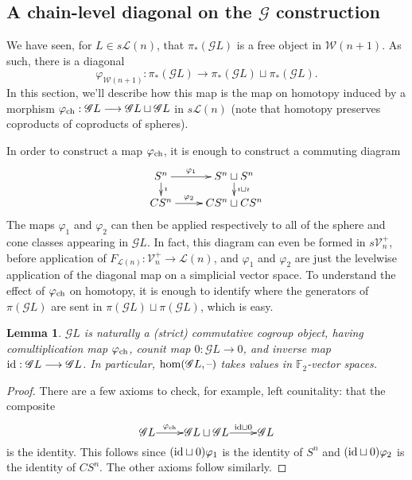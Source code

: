 \documentclass[11pt]{amsart}
\theoremstyle{plain}
\newtheorem{lem}[thm]{Lemma}
\theoremstyle{definition}
\newcommand{\DASH}{\textup{--}}
\let\phi\varphi
\renewcommand{\to}{\longrightarrow}
\newcommand{\scrQ}{\mathscr{Q}}
\newcommand{\scrR}{\mathscr{R}}
\newcommand{\scrT}{\mathscr{T}}
\newcommand{\scrY}{\mathscr{Y}}
\newcommand{\scrI}{\mathscr{I}}
\newcommand{\scrO}{\mathscr{O}}
\newcommand{\scrP}{\mathscr{P}}
\newcommand{\scrS}{\mathscr{S}}
\newcommand{\scrG}{\mathscr{G}}
\newcommand{\scrH}{\mathscr{H}}
\newcommand{\scrJ}{\mathscr{J}}
\newcommand{\scrK}{\mathscr{K}}
\newcommand{\scrL}{\mathscr{L}}
\newcommand{\scrZ}{\mathscr{Z}}
\newcommand{\scrN}{\mathscr{N}}
\newcommand{\scrM}{\mathscr{M}}
\newcommand{\calW}{\mathcal{W}}
\newcommand{\calL}{\mathcal{L}}
\newcommand{\calV}{\mathcal{V}}
\theoremstyle{plain}
\newcommand{\vect}[2]{\calV^{#1}_{#2}}
\newcommand{\BSW}{{\scrG}}%
\newcommand{\F}{\mathbb{F}}
\begin{document}
\begin{comp func sseq old version}
\begin{shaded}\tiny
\subsection{A chain-level diagonal on the $\BSW $ construction}
We have seen, for $L\in s\calL(n)$, that $\pi_*(\BSW L)$ is a free object in $\calW(n+1)$. As such, there is a diagonal
\[\phi_{\calW(n+1)}:\pi_*(\BSW L)\to \pi_*(\BSW L)\sqcup \pi_*(\BSW L).\]
In this section, we'll describe how this map is the map on homotopy induced by a morphism $\phi_\textup{ch}:\BSW L\to \BSW L\sqcup \BSW L$ in $s\calL(n)$ (note that homotopy preserves coproducts of coproducts of spheres). 

In order to construct a map $\phi_\textup{ch}$, it is enough to construct a commuting diagram
\[\xymatrix@R=4mm{
S^n\ar[r]^-{\phi_1}
\ar[d]^-{\imath}
&%
S^n\sqcup S^n\ar[d]^-{\imath\sqcup\imath}
\\%
CS^n\ar[r]^-{\phi_2}
&%
CS^n\sqcup CS^n%
}\]
The maps $\phi_1$ and $\phi_2$ can then be applied respectively to all of the sphere and cone classes appearing in $\BSW L$.
In fact, this diagram can even be formed in $s\vect{+}{n}$, before application of $F_{\calL(n)}:\vect{+}{n}\to\calL(n)$, and $\phi_1$ and $\phi_2$ are just the levelwise application of the diagonal map on a simplicial vector space. To understand the effect of $\phi_{\textup{ch}}$ on homotopy, it is enough to identify where the generators of $\pi(\BSW L)$ are sent in $\pi(\BSW L)\sqcup\pi(\BSW L)$, which is easy.
\begin{lem}
$\BSW L$ is naturally a (strict) commutative cogroup object, having comultiplication map $\phi_{\textup{ch}}$, counit map $0:\BSW L\to 0$, and inverse map $\textup{id}:\BSW L\to \BSW L$. In particular, $\hom(\BSW L,\DASH)$ takes values in $\ensuremath{\F_2}$-vector spaces.
\end{lem}
\begin{proof}
There are a few axioms to check, for example, left counitality: that the composite 
\[\xymatrix@R=4mm@1{
\BSW L\ar[r]^-{\phi_{\textup{ch}}}
&%
\BSW L\sqcup \BSW L\ar[r]^-{\textup{id}\sqcup0}
&%
\BSW L%
}\] is the identity. This follows since $(\textup{id}\sqcup0)\phi_1$ is the identity of $S^n$ and $(\textup{id}\sqcup0)\phi_2$ is the identity of $CS^n$. The other axioms follow similarly.
\end{proof}


\end{shaded}
\end{comp func sseq old version}
\end{document}
